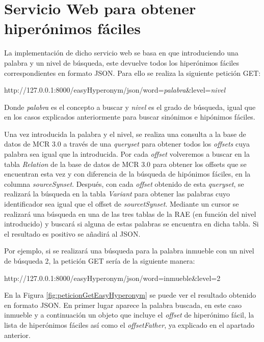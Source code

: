 \section{Servicio Web  para obtener hiperónimos fáciles}
La implementación de dicho servicio web se basa en que introduciendo una palabra y un nivel de búsqueda, este devuelve todos los hiperónimos fáciles correspondientes en formato JSON. Para ello se realiza la siguiente petición GET:

http://127.0.0.1:8000/easyHyperonym/json/word=\textit{palabra}\&level=\textit{nivel}

Donde \textit{palabra} es el concepto a buscar y \textit{nivel} es el grado de búsqueda, igual que en los casos explicados anteriormente para buscar sinónimos e hipónimos fáciles.

Una vez introducida la palabra y el nivel, se realiza una consulta a la base de datos de MCR 3.0 a través de una \textit{queryset} para obtener todos los \textit{offsets} cuya palabra sea igual que la introducida.
Por cada \textit{offset} volveremos a buscar en la tabla \textit{Relation} de la base de datos de MCR 3.0 para obtener los offsets que se encuentran esta vez y con diferencia de la búsqueda de hipónimos fáciles, en la columna \textit{sourceSynset}. Después, con cada \textit{offset} obtenido de esta \textit{queryset}, se realizará la búsqueda en la tabla \textit{Variant} para obtener las palabras cuyo identificador sea igual que el offset de \textit{sourcetSynset}.
Mediante un cursor se realizará una búsqueda en una de las tres tablas de la RAE (en función del nivel introducido) y buscará si alguna de estas palabras se encuentra en dicha tabla.
Si el resultado es positivo se añadirá al JSON.

Por ejemplo, si se realizará una búsqueda para la palabra inmueble con un nivel de búsqueda 2, la petición GET sería de la siguiente manera:

http://127.0.0.1:8000/easyHyperonym/json/word=inmueble\&level=2

En la Figura \ref{fig:peticionGetEasyHyperonym} se puede ver el resultado obtenido en formato JSON. En primer lugar aparece la palabra buscada, en este caso inmueble y a continuación un objeto que incluye el \textit{offset} de hiperónimo fácil, la lista de hiperónimos fáciles así como el \textit{offsetFather}, ya explicado en el apartado anterior.


